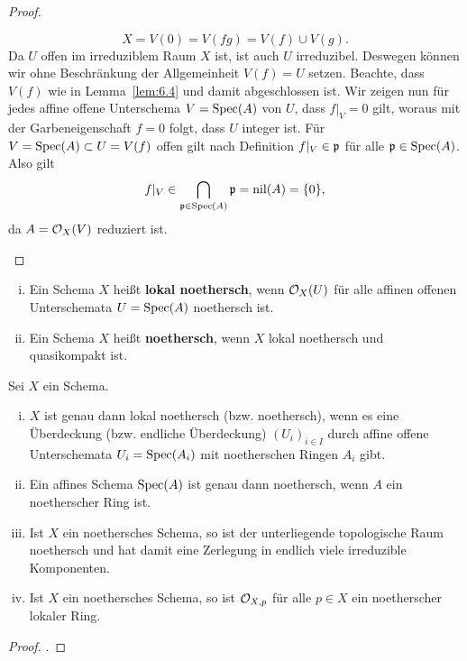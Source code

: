 \begin{prop}
\begin{proof}
\begin{enumerate}[i)]
			\[
				X = V(0) = V(fg) = V(f) \cup V(g).
			\]
			Da $U$ offen im irreduziblem Raum $X$ ist, ist auch $U$ irreduzibel. Deswegen können wir ohne Beschränkung der Allgemeinheit $V(f) = U$ setzen. Beachte, dass $V(f)$ wie in Lemma~\ref{lem:6.4} und damit abgeschlossen ist. Wir zeigen nun für jedes affine offene Unterschema $V=\operatorname{Spec}(A)$ von $U$, dass $f\vert_V = 0$ gilt, woraus mit der Garbeneigenschaft $f=0$ folgt, dass $U$ integer ist. Für $V=\operatorname{Spec}(A) \subset U = V(f)$ offen gilt nach Definition $f\vert_V \in \mathfrak{p}$ für alle $\mathfrak{p} \in \operatorname{Spec}(A)$. Also gilt
			\[
				f\vert_V \in \bigcap_{\mathfrak{p} \in \operatorname{Spec}(A)} \mathfrak{p} = \operatorname{nil}(A) = \{0\},
			\]
			da $A = \mathcal{O}_X(V)$ reduziert ist.
		\end{enumerate}
	\end{proof}
\end{prop}

\begin{defn}
\label{defn:6.6}
	\begin{enumerate}[i)]
		\item Ein Schema $X$ heißt \textbf{lokal noethersch}, wenn $\mathcal{O}_{X}(U)$ für alle affinen offenen Unterschemata $U = \operatorname{Spec}(A)$ noethersch ist.
		\item Ein Schema $X$ heißt \textbf{noethersch}, wenn $X$ lokal noethersch und quasikompakt ist.
	\end{enumerate}
\end{defn}

\begin{prop}
\label{prop:6.7}
	Sei $X$ ein Schema.
	\begin{enumerate}[i)]
		\item $X$ ist genau dann lokal noethersch (bzw. noethersch), wenn es eine Überdeckung (bzw. endliche Überdeckung) $(U_i)_{i\in I}$ durch affine offene Unterschemata $U_i = \operatorname{Spec}(A_i)$ mit noetherschen Ringen $A_i$ gibt.
		\item Ein affines Schema $\operatorname{Spec}(A)$ ist genau dann noethersch, wenn $A$ ein noetherscher Ring ist.
		\item Ist $X$ ein noethersches Schema, so ist der unterliegende topologische Raum noethersch und hat damit eine Zerlegung in endlich viele irreduzible Komponenten.
		\item Ist $X$ ein noethersches Schema, so ist $\mathcal{O}_{X,p}$ für alle $p \in X$ ein noetherscher lokaler Ring.
	\end{enumerate}
	\begin{proof}
		\cite[Proposition~II.3.2]{hartshorne1977algebraic}.
	\end{proof}
\end{prop}


